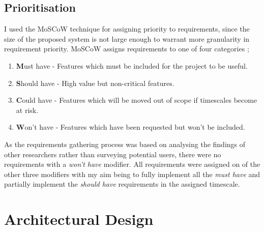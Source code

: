 \subsection{Prioritisation}
I used the MoSCoW technique for assigning priority to requirements, since the size of the proposed system is not large enough to warrant more granularity in requirement priority. MoSCoW assigns requirements to one of four categories \citep{PrioritizationUsingMoscow};
\begin{enumerate}
	\item \textbf{M}ust have - Features which must be included for the project to be useful.
	\item \textbf{S}hould have - High value but non-critical features.
	\item \textbf{C}ould have - Features which will be moved out of scope if timescales become at risk.
	\item \textbf{W}on't have - Features which have been requested but won't be included. 
\end{enumerate}
As the requirements gathering process was based on analysing the findings of other researchers rather than surveying potential users, there were no requirements with a \textit{won't have} modifier. All requirements were assigned on of the other three modifiers with my aim being to fully implement all the \textit{must have} and partially implement the \textit{should have} requirements in the assigned timescale.

\section{Architectural Design}
